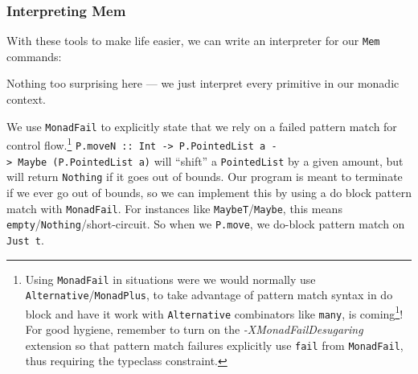 \documentclass[]{article}
\newenvironment{Shaded}{}{}
\newcommand{\CommentTok}[1]{\textcolor[rgb]{0.38,0.63,0.69}{\textit{#1}}}
\newcommand{\DataTypeTok}[1]{\textcolor[rgb]{0.56,0.13,0.00}{#1}}
\newcommand{\DecValTok}[1]{\textcolor[rgb]{0.25,0.63,0.44}{#1}}
\newcommand{\FunctionTok}[1]{\textcolor[rgb]{0.02,0.16,0.49}{#1}}
\newcommand{\KeywordTok}[1]{\textcolor[rgb]{0.00,0.44,0.13}{\textbf{#1}}}
\newcommand{\NormalTok}[1]{#1}
\newcommand{\OtherTok}[1]{\textcolor[rgb]{0.00,0.44,0.13}{#1}}
\renewcommand{\href}[2]{#2\footnote{\url{#1}}}
\begin{document}
\hypertarget{interpreting-mem}{%
\subsubsection{Interpreting Mem}\label{interpreting-mem}}

With these tools to make life easier, we can write an interpreter for our
\texttt{Mem} commands:

\begin{Shaded}
\end{Shaded}

Nothing too surprising here --- we just interpret every primitive in our monadic
context.

We use \texttt{MonadFail} to explicitly state that we rely on a failed pattern
match for control flow.\footnote{Using \texttt{MonadFail} in situations were we
  would normally use \texttt{Alternative}/\texttt{MonadPlus}, to take advantage
  of pattern match syntax in do block and have it work with \texttt{Alternative}
  combinators like \texttt{many}, is
  \href{https://wiki.haskell.org/MonadFail_Proposal}{coming}! For good hygiene,
  remember to turn on the \emph{-XMonadFailDesugaring} extension so that pattern
  match failures explicitly use \texttt{fail} from \texttt{MonadFail}, thus
  requiring the typeclass constraint.}
\texttt{P.moveN\ ::\ Int\ -\textgreater{}\ P.PointedList\ a\ -\textgreater{}\ Maybe\ (P.PointedList\ a)}
will ``shift'' a \texttt{PointedList} by a given amount, but will return
\texttt{Nothing} if it goes out of bounds. Our program is meant to terminate if
we ever go out of bounds, so we can implement this by using a do block pattern
match with \texttt{MonadFail}. For instances like
\texttt{MaybeT}/\texttt{Maybe}, this means
\texttt{empty}/\texttt{Nothing}/short-circuit. So when we \texttt{P.move}, we
do-block pattern match on \texttt{Just\ t\textquotesingle{}}.
\end{document}
